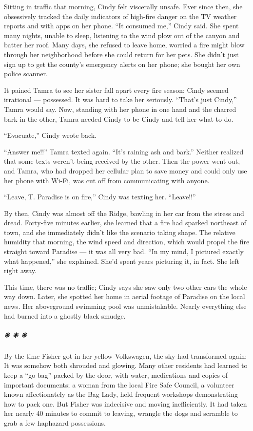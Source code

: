 Sitting in traffic that morning, Cindy felt viscerally unsafe. Ever
since then, she obsessively tracked the daily indicators of high-fire
danger on the TV weather reports and with apps on her phone. ``It
consumed me,'' Cindy said. She spent many nights, unable to sleep,
listening to the wind plow out of the canyon and batter her roof. Many
days, she refused to leave home, worried a fire might blow through her
neighborhood before she could return for her pets. She didn't just sign
up to get the county's emergency alerts on her phone; she bought her own
police scanner.

It pained Tamra to see her sister fall apart every fire season; Cindy
seemed irrational --- possessed. It was hard to take her seriously.
``That's just Cindy,'' Tamra would say. Now, standing with her phone in
one hand and the charred bark in the other, Tamra needed Cindy to be
Cindy and tell her what to do.

``Evacuate,'' Cindy wrote back.

``Answer me!!'' Tamra texted again. ``It's raining ash and bark.''
Neither realized that some texts weren't being received by the other.
Then the power went out, and Tamra, who had dropped her cellular plan to
save money and could only use her phone with Wi-Fi, was cut off from
communicating with anyone.

``Leave, T. Paradise is on fire,'' Cindy was texting her. ``Leave!!''

By then, Cindy was almost off the Ridge, bawling in her car from the
stress and dread. Forty-five minutes earlier, she learned that a fire
had sparked northeast of town, and she immediately didn't like the
scenario taking shape. The relative humidity that morning, the wind
speed and direction, which would propel the fire straight toward
Paradise --- it was all very bad. ``In my mind, I pictured exactly what
happened,'' she explained. She'd spent years picturing it, in fact. She
left right away.

This time, there was no traffic; Cindy says she saw only two other cars
the whole way down. Later, she spotted her home in aerial footage of
Paradise on the local news. Her aboveground swimming pool was
unmistakable. Nearly everything else had burned into a ghostly black
smudge.

\hypertarget{--}{%
\subparagraph{❈ ❈ ❈}\label{--}}

By the time Fisher got in her yellow Volkswagen, the sky had transformed
again: It was somehow both shrouded and glowing. Many other residents
had learned to keep a ``go bag'' packed by the door, with water,
medications and copies of important documents; a woman from the local
Fire Safe Council, a volunteer known affectionately as the Bag Lady,
held frequent workshops demonstrating how to pack one. But Fisher was
indecisive and moving inefficiently. It had taken her nearly 40 minutes
to commit to leaving, wrangle the dogs and scramble to grab a few
haphazard possessions.

